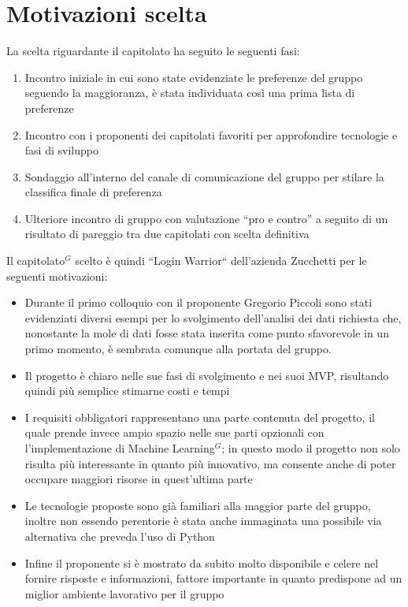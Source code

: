 \section{Motivazioni scelta}
La scelta riguardante il capitolato ha seguito le seguenti fasi:
\begin{enumerate}
	\item Incontro iniziale in cui sono state evidenziate le preferenze del gruppo seguendo la maggioranza, è stata individuata così una prima lista di preferenze
	\item Incontro con i proponenti dei capitolati favoriti per approfondire tecnologie e fasi di sviluppo
	\item Sondaggio all'interno del canale di comunicazione del gruppo per stilare la classifica finale di preferenza
	\item Ulteriore incontro di gruppo con valutazione ``pro e contro'' a seguito di un risultato di pareggio tra due capitolati con scelta definitiva
\end{enumerate}
Il capitolato$^{G}$ scelto è quindi ``Login Warrior`` dell'azienda Zucchetti per le seguenti motivazioni:
\begin{itemize}
	\item Durante il primo colloquio con il proponente Gregorio Piccoli sono stati evidenziati diversi esempi per lo svolgimento dell'analisi dei dati richiesta che, nonostante la mole di dati fosse stata inserita come punto sfavorevole in un primo momento, è sembrata comunque alla portata del gruppo.
	\item Il progetto è chiaro nelle sue fasi di svolgimento e nei suoi MVP, risultando quindi più semplice stimarne costi e tempi
	\item I requisiti obbligatori rappresentano una parte contenuta del progetto, il quale prende invece ampio spazio nelle sue parti opzionali con l'implementazione di Machine Learning$^{G}$; in questo modo il progetto non solo risulta più interessante in quanto più innovativo, ma consente anche di poter occupare maggiori risorse in quest'ultima parte
	\item Le tecnologie proposte sono già familiari alla maggior parte del gruppo, inoltre non essendo perentorie è stata anche immaginata una possibile via alternativa che preveda l'uso di Python
	\item Infine il proponente si è mostrato da subito molto disponibile e celere nel fornire risposte e informazioni, fattore importante in quanto predispone ad un miglior ambiente lavorativo per il gruppo
\end{itemize}
